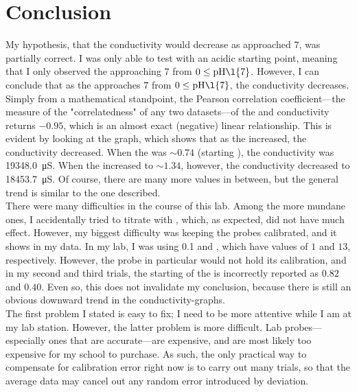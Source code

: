 \documentclass[a4paper]{article}
\newcommand{\pH}{\text{pH}}
\begin{document}
    \section{Conclusion}
        My hypothesis, that the conductivity would decrease as \pH approached $7$, was
        partially correct. I was only able to test with an acidic starting point, meaning
        that I only observed the \pH approaching $7$ from $0\le{\pH}\l{7}$. However, I can
        conclude that as the \pH approaches $7$ from $0\le{\pH}\l{7}$, the conductivity decreases.
        Simply from a mathematical standpoint, the Pearson correlation coefficient---the measure of the
        "correlatedness" of any two datasets---of the \pH and conductivity returns
        $-0.95$, which is an almost exact (negative) linear relationship. This is evident
        by looking at the graph, which shows that as the \pH increased, the conductivity
        decreased. When the \pH was $\sim0.74$ (starting \pH), the conductivity was
        \SI{19348.0}{\micro\siemens}. When the \pH increased to $\sim1.34$, however,
        the conductivity decreased to \SI{18453.7}{\micro\siemens}. Of course, there are
        many more values in between, but the general trend is similar to the one described.
        \\
        There were many difficulties in the course of this lab. Among the more mundane ones,
        I accidentally tried to titrate  with , which, as expected, did not
        have much effect. However, my biggest difficulty was keeping the probes calibrated,
        and it shows in my data. In my lab, I was using \SI{0.1}{\Molar}  and ,
        which have \pH values of $1$ and $13$, respectively. However, the \pH probe in particular
        would not hold its calibration, and in my second and third trials, the starting \pH
        of the  is incorrectly reported as $0.82$ and $0.40$. Even so, this does not
        invalidate my conclusion, because there is still an obvious downward trend in the
        conductivity-\pH graphs.
        \\
        The first problem I stated is easy to fix; I need to be more attentive while I am
        at my lab station. However, the latter problem is more difficult. Lab probes---especially
        ones that are accurate---are expensive, and are most likely too expensive for my
        school to purchase. As such, the only practical way to compensate for calibration
        error right now is to carry out many trials, so that the average data may cancel
        out any random error introduced by deviation.
\end{document}
